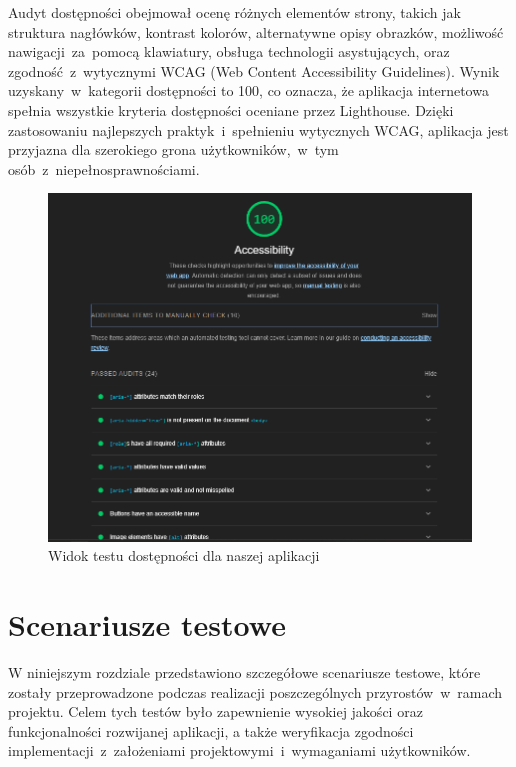  Audyt dostępności obejmował ocenę różnych elementów strony, takich jak 
 struktura nagłówków, kontrast kolorów, alternatywne opisy obrazków, możliwość nawigacji~za~pomocą klawiatury, 
 obsługa technologii asystujących, oraz zgodność~z~wytycznymi WCAG (Web Content Accessibility Guidelines). \newline
 \indent Wynik uzyskany~w~kategorii dostępności to 100, co oznacza, że aplikacja internetowa spełnia wszystkie kryteria dostępności oceniane przez Lighthouse.
 Dzięki zastosowaniu najlepszych praktyk~i~spełnieniu wytycznych WCAG, aplikacja jest przyjazna dla szerokiego grona użytkowników,~w~tym osób~z~niepełnosprawnościami.
\begin{figure}[H]
    \centering
    \includegraphics[width=1\textwidth]{attachments/testy-dostepnosci}
    \caption{Widok testu dostępności dla naszej aplikacji}
    \label{fig:testy-dostepnosci-zdjecie}
    \end{figure}


\section{Scenariusze testowe}
\label{sec:scenariusze-testowe}

W niniejszym rozdziale przedstawiono szczegółowe scenariusze testowe, które zostały przeprowadzone podczas realizacji 
poszczególnych przyrostów~w~ramach projektu. Celem tych testów było zapewnienie wysokiej jakości oraz funkcjonalności 
rozwijanej aplikacji, a także weryfikacja zgodności implementacji~z~założeniami projektowymi~i~wymaganiami użytkowników.

